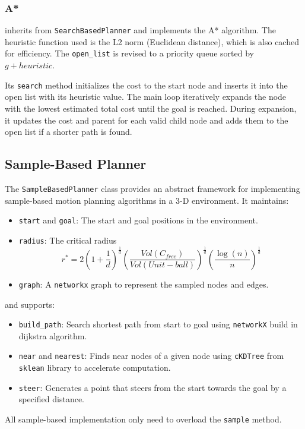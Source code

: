 \documentclass[conference]{IEEEtran}
\begin{document}
\subsubsection{A*}
inherits from \texttt{SearchBasedPlanner} and implements the A* algorithm.
The heuristic function used is the L2 norm (Euclidean distance), which is also cached for efficiency. 
The \texttt{open\_list} is revised to a priority queue sorted by $g + heuristic$.

Its \texttt{search} method initializes the cost to the start node 
and inserts it into the open list with its heuristic value. 
The main loop iteratively expands the node with the lowest estimated total cost until the goal is reached. 
During expansion, it updates the cost and parent for each valid child node 
and adds them to the open list if a shorter path is found.

\subsection{Sample-Based Planner}
The \texttt{SampleBasedPlanner} class provides an abstract framework for implementing sample-based motion planning algorithms in a 3-D environment. It maintains:
\begin{itemize}
    \item \texttt{start} and \texttt{goal}: The start and goal positions in the environment.
    \item \texttt{radius}: The critical radius
    $$r^* = 2\left( 1+\frac{1}{d}  \right)^{\frac{1}{d} } \left( \frac{Vol(C_{free})}{Vol(Unit-ball)}  \right)^{\frac{1}{d} } \left( \frac{\log \left( n \right) }{n}  \right)^{\frac{1}{d} } $$
    \item \texttt{graph}: A \texttt{networkx} graph to represent the sampled nodes and edges.
\end{itemize}
and supports:
\begin{itemize}
    \item \texttt{build\_path}: Search shortest path from start to goal 
    using \texttt{networkX} build in dijkstra algorithm.
    \item \texttt{near} and \texttt{nearest}: Finds near nodes of a given node
    using \texttt{cKDTree} from \texttt{sklean} library to accelerate computation.
    \item \texttt{steer}: Generates a point that steers from the start towards the goal by a specified distance.
\end{itemize}
All sample-based implementation only need to overload the \texttt{sample} method.
\end{document}
